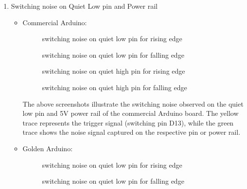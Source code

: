 \documentclass[a4paper,11pt]{article}%
\begin{document}
\begin{enumerate}
	\item Switching noise on Quiet Low pin and Power rail
	      \begin{itemize}
		      \item Commercial Arduino:
		            \begin{figure}[H]
			            \centering
			            \caption{switching noise on quiet low pin for rising edge}
		            \end{figure}

		            \begin{figure}[H]
			            \centering
			            \caption{switching noise on quiet low pin for falling edge}
		            \end{figure}

		            \begin{figure}[H]
			            \centering
			            \caption{switching noise on quiet high pin for rising edge}
		            \end{figure}

		            

					\begin{figure}[H]
			            \centering
			            \caption{switching noise on quiet high pin for falling edge}
		            \end{figure}

		            The above screenshots illustrate the switching noise observed on the quiet low pin and 5V power rail of the commercial Arduino board. The yellow trace represents the trigger signal (switching pin D13), while the green trace shows the noise signal captured on the respective pin or power rail.
		      \item Golden Arduino:

		            \begin{figure}[H]
			            \centering
			            \caption{switching noise on quiet low pin for rising edge}
		            \end{figure}

		            \begin{figure}[H]
			            \centering
			            \caption{switching noise on quiet low pin for falling edge}
		            \end{figure}


\end{itemize}
\end{enumerate}
\end{document}
